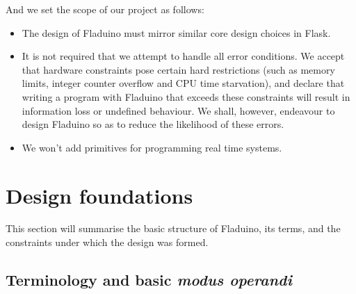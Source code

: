 \documentclass[a4paper, oneside, final]{memoir}
\begin{document}
And we set the scope of our project as follows:
\begin{itemize}
\item The design of Fladuino must mirror similar core design choices
  in Flask.
\item It is not required that we attempt to handle all error
  conditions.  We accept that hardware constraints pose certain hard
  restrictions (such as memory limits, integer counter overflow and
  CPU time starvation), and declare that writing a program with
  Fladuino that exceeds these constraints will result in information
  loss or undefined behaviour.  We shall, however, endeavour to design
  Fladuino so as to reduce the likelihood of these errors.
\item We won't add primitives for programming real time systems.
\end{itemize}

\section{Design foundations}

This section will summarise the basic structure of Fladuino, its
terms, and the constraints under which the design was formed.

\subsection{Terminology and basic \textit{modus operandi}}
\end{document}
